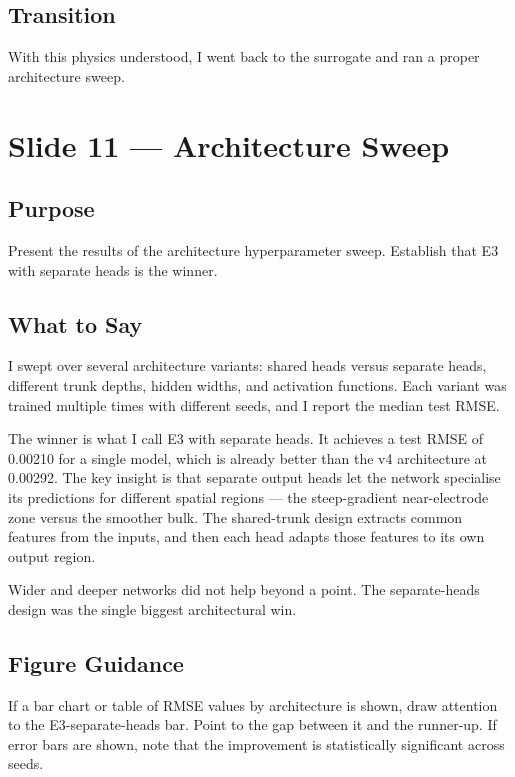 \documentclass[12pt,a4paper]{article}
\begin{document}
\subsection*{Transition}
With this physics understood, I went back to the surrogate and ran
a proper architecture sweep.

\clearpage

\section{Slide 11 --- Architecture Sweep}
\label{sec:slide11}

\subsection*{Purpose}
Present the results of the architecture hyperparameter sweep.
Establish that E3 with separate heads is the winner.

\subsection*{What to Say}

I swept over several architecture variants: shared heads versus
separate heads, different trunk depths, hidden widths, and activation
functions. Each variant was trained multiple times with different
seeds, and I report the median test RMSE.

The winner is what I call E3 with separate heads. It achieves a test
RMSE of 0.00210 for a single model, which is already better than the
v4 architecture at 0.00292. The key insight is that separate output
heads let the network specialise its predictions for different spatial
regions --- the steep-gradient near-electrode zone versus the smoother
bulk. The shared-trunk design extracts common features from the inputs,
and then each head adapts those features to its own output region.

Wider and deeper networks did not help beyond a point. The
separate-heads design was the single biggest architectural win.

\subsection*{Figure Guidance}
If a bar chart or table of RMSE values by architecture is shown,
draw attention to the E3-separate-heads bar. Point to the gap between
it and the runner-up. If error bars are shown, note that the
improvement is statistically significant across seeds.
\end{document}
